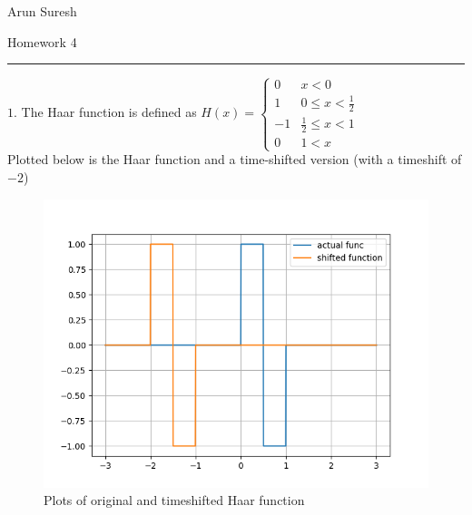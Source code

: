 \documentclass[12pt]{article}
\begin{document}
	\quad \quad \quad \quad \quad \quad \quad \quad \quad \quad  \quad \quad \quad \quad \quad \quad \quad \quad \quad \quad  \quad \quad \quad \quad \quad \quad \quad \quad \quad \quad  Arun Suresh
	\begin{center}
		Homework 4
	\end{center} 
	{\rule{\linewidth}{0.1mm} }
	
\indent $1.$ The Haar function is defined as $H(x) =  \begin{cases} 
0 & x< 0 \\
1 & 0\leq x < \frac{1}{2} \\
-1 & \frac{1}{2} \leq x < 1\\
0 & 1<x 
\end{cases}$\\
Plotted below is the Haar function and a time-shifted version (with a timeshift of $-2$) \\
\begin{figure}[h]
	\centering
	\includegraphics[scale=0.40]{Haar_space_domain.png}
	\caption{Plots of original and timeshifted Haar function}
\end{figure}
\end{document}
